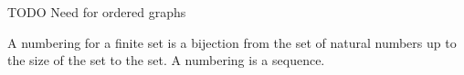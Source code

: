 


TODO
Need for ordered graphs


A numbering for a finite set is a bijection from the set of natural numbers up to the size of the set to the set.
A numbering is a sequence.

